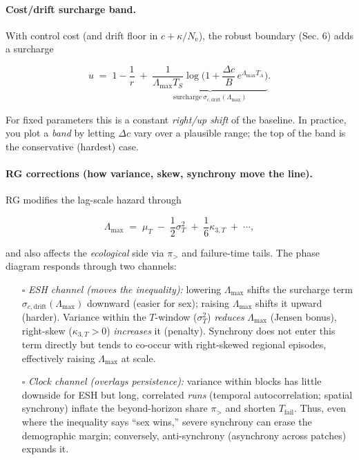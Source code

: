 \documentclass[11pt]{article}
\theoremstyle{upright}
\newcommand{\horizon}{\Lambda}
\newcommand{\Ne}{N_{\mathrm{e}}}
\newcommand{\Lmax}{\horizon^{(T)}_{\max}}
\renewcommand{\Lmax}{\Lambda_{\max}}
\begin{document}
\paragraph{Cost/drift surcharge band.}
With control cost (and drift floor in $c+\kappa/\Ne$), the robust boundary (Sec. 6) adds a surcharge

$$
u\;=\;1-\frac{1}{r}\;+\;\underbrace{\frac{1}{\Lmax T_S}\log\!\Big(1+\frac{\Delta c}{B}\,e^{\Lmax T_A}\Big)}_{\text{surcharge}~\sigma_{c,\mathrm{drift}}(\Lmax)}.
$$

For fixed parameters this is a constant \emph{right/up shift} of the baseline. In practice, you plot a \emph{band} by letting $\Delta c$ vary over a plausible range; the top of the band is the conservative (hardest) case.

\paragraph{RG corrections (how variance, skew, synchrony move the line).}
RG modifies the lag-scale hazard through

$$
\Lmax \;=\; \mu_T \;-\;\frac{1}{2}\sigma_T^2 \;+\;\frac{1}{6}\kappa_{3,T}\;+\;\cdots,
$$

and also affects the \emph{ecological} side via $\pi_{>}$ and failure-time tails. The phase diagram responds through two channels:

\begin{itemize}
\item[$\square$] \emph{ESH channel (moves the inequality):} lowering $\Lmax$ shifts the surcharge term $\sigma_{c,\mathrm{drift}}(\Lmax)$ downward (easier for sex); raising $\Lmax$ shifts it upward (harder). Variance within the $T$-window ($\sigma_T^2$) \emph{reduces} $\Lmax$ (Jensen bonus), right-skew ($\kappa_{3,T}>0$) \emph{increases} it (penalty). Synchrony does not enter this term directly but tends to co-occur with right-skewed regional episodes, effectively raising $\Lmax$ at scale.
\item[$\square$] \emph{Clock channel (overlays persistence):} variance within blocks has little downside for ESH but long, correlated \emph{runs} (temporal autocorrelation; spatial synchrony) inflate the beyond-horizon share $\pi_{>}$ and shorten $T_{\mathrm{fail}}$. Thus, even where the inequality says “sex wins,” severe synchrony can erase the demographic margin; conversely, anti-synchrony (asynchrony across patches) expands it.
\end{itemize}
\end{document}
